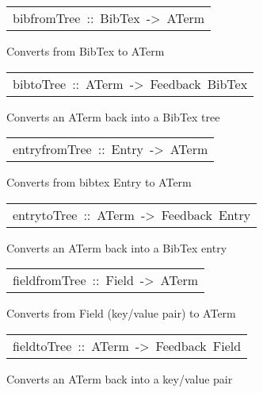 \begin{haddockdesc}
\item[\begin{tabular}{@{}l}
bibfromTree\ ::\ BibTex\ ->\ ATerm
\end{tabular}]\haddockbegindoc
Converts from BibTex to ATerm
\par

\end{haddockdesc}
\begin{haddockdesc}
\item[\begin{tabular}{@{}l}
bibtoTree\ ::\ ATerm\ ->\ Feedback\ BibTex
\end{tabular}]\haddockbegindoc
Converts an ATerm back into a BibTex tree
\par

\end{haddockdesc}
\begin{haddockdesc}
\item[\begin{tabular}{@{}l}
entryfromTree\ ::\ Entry\ ->\ ATerm
\end{tabular}]\haddockbegindoc
Converts from bibtex Entry to ATerm
\par

\end{haddockdesc}
\begin{haddockdesc}
\item[\begin{tabular}{@{}l}
entrytoTree\ ::\ ATerm\ ->\ Feedback\ Entry
\end{tabular}]\haddockbegindoc
Converts an ATerm back into a BibTex entry
\par

\end{haddockdesc}
\begin{haddockdesc}
\item[\begin{tabular}{@{}l}
fieldfromTree\ ::\ Field\ ->\ ATerm
\end{tabular}]\haddockbegindoc
Converts from Field (key/value pair) to ATerm
\par

\end{haddockdesc}
\begin{haddockdesc}
\item[\begin{tabular}{@{}l}
fieldtoTree\ ::\ ATerm\ ->\ Feedback\ Field
\end{tabular}]\haddockbegindoc
Converts an ATerm back into a key/value pair
\par

\end{haddockdesc}
